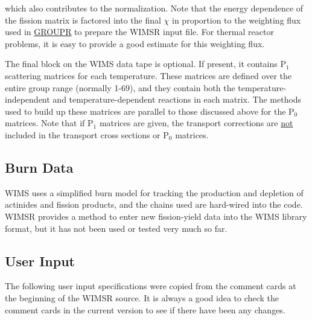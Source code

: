 \noindent
which also contributes to the normalization.  Note that the energy
dependence of the fission matrix is factored into the final $\chi$ in
proportion to the weighting flux used in
\hyperlink{sGROUPRhy}{GROUPR} to prepare the WIMSR
input file.  For thermal reactor problems, it is easy to provide a
good estimate for this weighting flux.

The final block on the WIMS data tape is optional.  If present,
it contains P$_1$ scattering matrices for each temperature.  These
matrices are defined over the entire group range (normally 1-69),
and they contain both the temperature-independent and
temperature-dependent reactions in each matrix.  The methods
used to build up these matrices are parallel to those discussed
above for the P$_0$ matrices.  Note that if P$_1$ matrices are given,
the transport corrections are \underline{not} included in the transport
cross sections or P$_0$ matrices.


\subsection{Burn Data}
\label{ssWIMSR_burn}

WIMS uses a simplified burn model for tracking the production and
depletion of actinides and fission products, and the chains used
are hard-wired into the code.  WIMSR provides a method to enter
new fission-yield data into the WIMS library format, but it has not
been used or tested very much so far.

\subsection{User Input}
\label{ssWIMSR_inp}

The following user input specifications were copied from the comment
cards at the beginning of the WIMSR source.  It is always a good idea
to check the comment cards in the current version to see if there
have been any changes.

